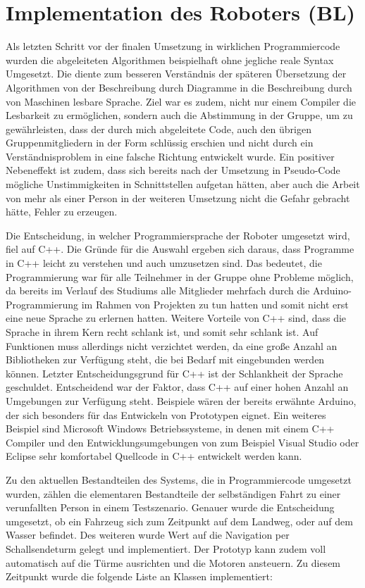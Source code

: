 \documentclass[conference]{IEEEtran}
\begin{document}
\section{Implementation des Roboters (BL)}
{
Als letzten Schritt vor der finalen Umsetzung in wirklichen Programmiercode wurden die abgeleiteten Algorithmen beispielhaft ohne jegliche reale Syntax Umgesetzt. Die diente zum besseren Verständnis der späteren Übersetzung der Algorithmen von der Beschreibung durch Diagramme in die Beschreibung durch von Maschinen lesbare Sprache. Ziel war es zudem, nicht nur einem Compiler die Lesbarkeit zu ermöglichen, sondern auch die Abstimmung in der Gruppe, um zu gewährleisten, dass der durch mich abgeleitete Code, auch den übrigen Gruppenmitgliedern in der Form schlüssig erschien und nicht durch ein Verständnisproblem in eine falsche Richtung entwickelt wurde. Ein positiver Nebeneffekt ist zudem, dass sich bereits nach der Umsetzung in Pseudo-Code mögliche Unstimmigkeiten in Schnittstellen aufgetan hätten, aber auch die Arbeit von mehr als einer Person in der weiteren Umsetzung nicht die Gefahr gebracht hätte, Fehler zu erzeugen. \par
Die Entscheidung, in welcher Programmiersprache der Roboter umgesetzt wird, fiel auf C++. Die Gründe für die Auswahl ergeben sich daraus, dass Programme in C++ leicht zu verstehen und auch umzusetzen sind. Das bedeutet, die Programmierung war für alle Teilnehmer in der Gruppe ohne Probleme möglich, da bereits im Verlauf des Studiums alle Mitglieder mehrfach durch die Arduino-Programmierung im Rahmen von Projekten zu tun hatten und somit nicht erst eine neue Sprache zu erlernen hatten. Weitere Vorteile von C++ sind, dass die Sprache in ihrem Kern recht schlank ist, und somit sehr schlank ist. Auf Funktionen muss allerdings nicht verzichtet werden, da eine große Anzahl an Bibliotheken zur Verfügung steht, die bei Bedarf mit eingebunden werden können. Letzter Entscheidungsgrund für C++ ist der Schlankheit der Sprache geschuldet. Entscheidend war der Faktor, dass C++ auf einer hohen Anzahl an Umgebungen zur Verfügung steht. Beispiele wären der bereits erwähnte Arduino, der sich besonders für das Entwickeln von Prototypen eignet. Ein weiteres Beispiel sind Microsoft Windows Betriebssysteme, in denen mit einem C++ Compiler und den Entwicklungsumgebungen von zum Beispiel  Visual Studio oder Eclipse sehr komfortabel Quellcode in C++ entwickelt werden kann.\par 
Zu den aktuellen Bestandteilen des Systems, die in Programmiercode umgesetzt wurden, zählen die elementaren Bestandteile der selbständigen Fahrt zu einer verunfallten Person in einem Testszenario. Genauer wurde die Entscheidung umgesetzt, ob ein Fahrzeug sich zum Zeitpunkt auf dem Landweg, oder auf dem Wasser befindet. Des weiteren wurde Wert auf die Navigation per Schallsendeturm gelegt und implementiert. Der Prototyp kann zudem voll automatisch auf die Türme ausrichten und die Motoren ansteuern. Zu diesem Zeitpunkt wurde die folgende Liste an Klassen implementiert: 

}
\end{document}
